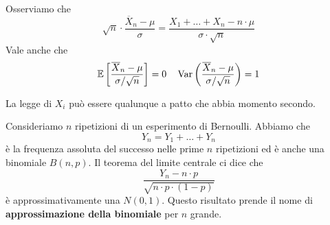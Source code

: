 \begin{observation}
	Osserviamo che
	\[
		\sqrt{n} \cdot \frac{\overline{X}_n - \mu}{\sigma} =
		\frac{X_1 + \dots + X_n - n \cdot \mu}{\sigma \cdot \sqrt{n}}
	\]
	Vale anche che
	\[
		\mathbb{E} \left[ \frac{\overline{X}_n - \mu}{\sigma / \sqrt{n}} \right] = 0 \quad
		\operatorname{Var} \left( \frac{\overline{X}_n - \mu}{\sigma / \sqrt{n}} \right) = 1
	\]
\end{observation}

\begin{observation}
	La legge di $X_i$ può essere qualunque a patto che abbia momento secondo.
\end{observation}

\begin{example}
	Consideriamo $n$ ripetizioni di un esperimento di Bernoulli. Abbiamo che
	\[ Y_n = Y_1 + \dots + Y_n \]
	è la frequenza assoluta del successo nelle prime $n$ ripetizioni ed è anche una binomiale
	$B(n,p)$. Il teorema del limite centrale ci dice che
	\[ \frac{Y_n - n \cdot p}{\sqrt{n \cdot p \cdot (1-p)}} \]
	è approssimativamente una $N(0,1)$. Questo risultato prende il nome di
	\textbf{approssimazione della binomiale} per $n$ grande.
\end{example}

